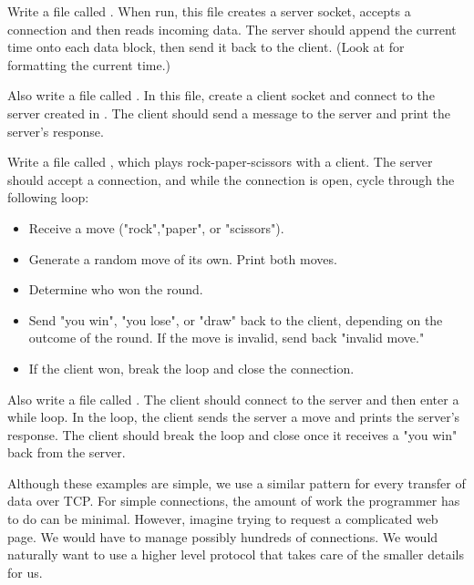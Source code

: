 \begin{problem}
Write a file called . When run, this file creates a server socket, accepts a connection and then reads incoming data. The server should append the current time onto each data block, then send it back to the client. (Look at   for formatting the current time.)

Also write a file called . In this file, create a client socket and connect to the server created in . The client should send a message to the server and print the server's response.
\end{problem}

\begin{problem}
Write a file called , which plays rock-paper-scissors with a client. The server should accept a connection, and while the connection is open, cycle through the following loop:
\begin {itemize}
	\item{Receive a move ("rock","paper", or "scissors").}
	\item{Generate a random move of its own. Print both moves.}
	\item{Determine who won the round.}
	\item{Send "you win", "you lose", or "draw" back to the client, depending on the outcome of the round. If the move is invalid, send back "invalid move."}
	\item{If the client won, break the loop and close the connection.}
\end{itemize}

Also write a file called . The client should connect to the server and then enter a while loop. In the loop, the client sends the server a move and prints the server's response. The client should break the loop and close once it receives a "you win" back from the server.
\end{problem}

Although these examples are simple, we use a similar pattern for every transfer of data over TCP.
For simple connections, the amount of work the programmer has to do can be minimal.
However, imagine trying to request a complicated web page.
We would have to manage possibly hundreds of connections.
We would naturally want to use a higher level protocol that takes care of the smaller details for us.


